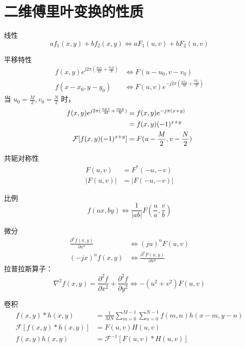 \documentclass[presentation]{beamer}
\begin{document}
\section{二维傅里叶变换的性质}
\label{sec:orgff32700}
\begin{frame}[label={sec:orgf1e75ab}]{线性}
\[af_1 (x,y)+bf_2(x,y) \Leftrightarrow aF_1(u,v)+bF_2(u,v) \]
\end{frame}
\begin{frame}[label={sec:org0c8c4ef}]{平移特性}
\begin{align*}
f(x,y)e^{j2\pi(\frac{u_0 x}{M}+\frac{v_0 y}{N})} &\Leftrightarrow F(u-u_0,v-v_0) \\
f(x-x_0,y-y_0) &\Leftrightarrow F(u,v)e^{-j2\pi(\frac{u x_0}{M}+\frac{v y_0}{N})}
\end{align*}
当 \(u_0=\frac{M}{2},v_0=\frac{N}{2}\) 时，
\begin{align*}
f(x,y)e^{j2\pi(\frac{u_0 x}{M}+\frac{v_0 y}{N})} &= f(x,y)e^{-j\pi(x+y)} \\
&=f(x,y)(-1)^{x+y} \\
{\cal F}[f(x,y)(-1)^{x+y}] &= F(u-\frac{M}{2},v-\frac{N}{2})
\end{align*}
\end{frame}
\begin{frame}[label={sec:org30f7796}]{共轭对称性}
\begin{align*}
F(u,v)&=F^{*}(-u,-v)\\
|F(u,v)|&=|F(-u,-v)|
\end{align*}
\end{frame}
\begin{frame}[label={sec:org151a1f7}]{比例}
\[f(ax,by) \Leftrightarrow \frac{1}{|ab|}F(\frac{u}{a},\frac{v}{b})\]
\end{frame}
\begin{frame}[label={sec:org5f0dde7}]{微分}
\begin{align*}
\frac{\partial^n f(x,y)}{\partial x^n} &\Leftrightarrow (ju)^n F(u,v) \\
(-jx)^n f(x,y) &\Leftrightarrow \frac{\partial^n F(x,y)}{\partial x^n}
\end{align*}
拉普拉斯算子：
\[\nabla^2 f(x,y) =\frac{\partial^2 f}{\partial x^2}+\frac{\partial^2 f}{\partial y^2} \Leftrightarrow -(u^2+v^2)F(u,v)  \]
\end{frame}

\begin{frame}[label={sec:org0fc3467}]{卷积}
\begin{align*}
f(x,y)*h(x,y) &= \frac{1}{MN}\sum_{m=0}^{M-1}\sum_{n=0}^{N-1}f(m,n)h(x-m,y-n) \\
\mathcal{F}[f(x,y)*h(x,y)] &= F(u,v)H(u,v)\\
f(x,y)h(x,y) &= \mathcal{F}^{-1}[F(u,v)*H(u,v)]
\end{align*}
\end{frame}
\end{document}
